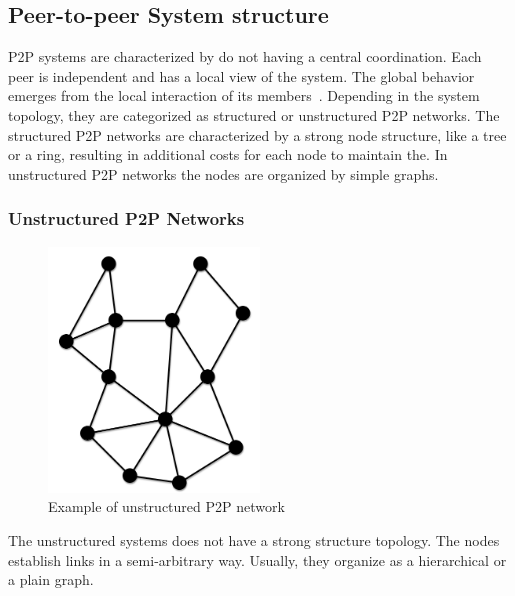 \subsection{Peer-to-peer System structure}
\label{sec:p2p_estructure}

P2P systems are characterized by do not having a central coordination. Each
peer is independent and has a local view of the system. The global behavior
emerges from the local interaction of its members~\cite{Aberer:2001:PIS:503271.503268}.
Depending in the system topology, they are categorized as structured or
unstructured P2P networks. The structured P2P networks are characterized by a
strong node structure, like a tree or a ring, resulting in additional costs for
each node to maintain the. In unstructured P2P networks the nodes are organized
by simple graphs.

\subsubsection{Unstructured P2P Networks}
\label{sec:p2p_unstructured}

\begin{figure}
\center
\includegraphics[width=0.5\textwidth]{img/p2p-unstructured}
\caption{Example of unstructured P2P network}
\label{fig:p2p_unstructured}
\end{figure}

The unstructured systems does not have a strong structure topology. The nodes
establish links in a semi-arbitrary way. Usually, they organize as a hierarchical or a
plain graph.

